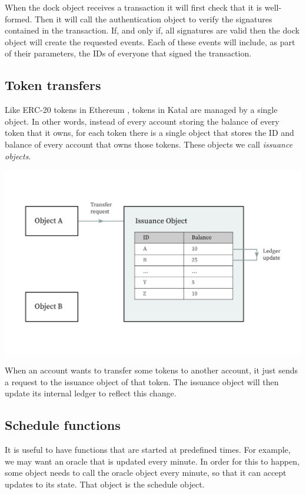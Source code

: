 \documentclass[conference]{IEEEtran}
\begin{document}
When the dock object receives a transaction it will first check that it is well-formed. Then it will call the authentication object to verify the signatures contained in the transaction. If, and only if, all signatures are valid then the dock object will create the requested events. Each of these events will include, as part of their parameters, the IDs of everyone that signed the transaction.

\subsection{Token transfers}
Like ERC-20 tokens in Ethereum \cite{buterin2014next}, tokens in Katal are managed by a single object. In other words, instead of every account storing the balance of every token that it owns, for each token there is a single object that stores the ID and balance of every account that owns those tokens. These objects we call \textit{issuance objects}.

\includegraphics[width=\linewidth]{images/issuance.jpg}

When an account wants to transfer some tokens to another account, it just sends a request to the issuance object of that token. The issuance object will then update its internal ledger to reflect this change.

\subsection{Schedule functions}
It is useful to have functions that are started at predefined times. For example, we may want an oracle that is updated every minute. In order for this to happen, some object needs to call the oracle object every minute, so that it can accept updates to its state. That object is the schedule object.
\end{document}
